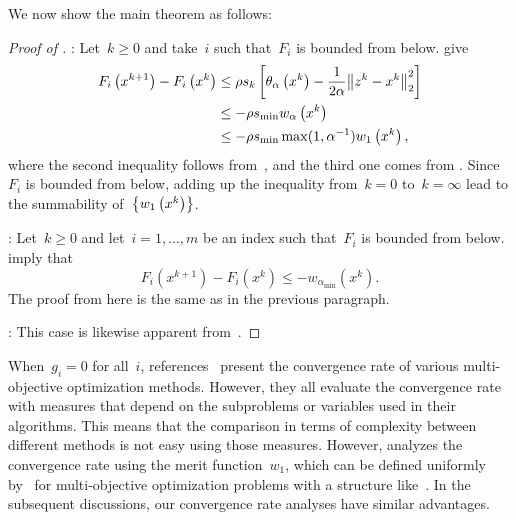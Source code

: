 \documentclass[../../main]{subfiles}
\begin{document}
We now show the main theorem as follows:
\begin{proof}[Proof of ]
    :
    Let~$k \ge 0$ and take~$i$ such that~$F_i$ is bounded from below.
     give
    \begin{align}
        F_i\left(x^{k + 1}\right) - F_i\left(x^k\right) &\le \rho s_k \left[ \theta_\alpha\left(x^k\right) - \frac{1}{2 \alpha} \norm*{z^k - x^k}_2^2 \right] \\
                                  &\le - \rho s_{\min} w_\alpha\left(x^k\right) \\
                                  &\le - \rho s_{\min} \max ( 1, \alpha^{-1} ) w_1\left(x^k\right)
    ,\end{align}
    where the second inequality follows from~, and the third one comes from .
    Since~$F_i$ is bounded from below, adding up the inequality from~$k = 0$ to~$k = \infty$ lead to the summability of~$\set*{w_1\left(x^k\right)}$.

    :
    Let~$k \ge 0$ and let~$i = 1, \dots, m$ be an index such that~$F_i$ is bounded from below.
     imply that
    \begin{equation}
        F_i\left(x^{k + 1}\right) - F_i\left(x^k\right) \le - w_{\alpha_{\min}}\left(x^k\right)
    .\end{equation} 
    The proof from here is the same as in the previous paragraph.

    :
    This case is likewise apparent from~.
\end{proof}
\begin{remark}
    When~$g_i = 0$ for all~$i$, references~\cite{Calderon2020,Fliege2019,Grapiglia2015} present the convergence rate of various multi-objective optimization methods.
    However, they all evaluate the convergence rate with measures that depend on the subproblems or variables used in their algorithms.
    This means that the comparison in terms of complexity between different methods is not easy using those measures.
    However,  analyzes the convergence rate using the merit function~$w_1$, which can be defined uniformly by~ for multi-objective optimization problems with a structure like~.
    In the subsequent discussions, our convergence rate analyses have similar advantages.
\end{remark}
\end{document}
